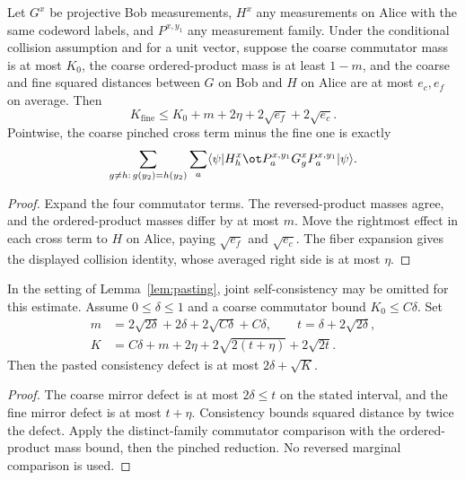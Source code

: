 \begin{lemma}
	\label{lem:pasting-distinct-fine-commutator}
	\leanok
	Let $G^x$ be projective Bob measurements, $H^x$ any measurements on Alice
	with the same codeword labels, and $P^{x,y_1}$ any measurement family.
	Under the conditional collision assumption and for a unit vector, suppose
	the coarse commutator mass is at most $K_0$, the coarse ordered-product
	mass is at least $1-m$, and the coarse and fine squared distances between
	$G$ on Bob and $H$ on Alice are at most $e_c,e_f$ on average. Then
	\[
	 K_{\mathrm{fine}}\leq K_0+m+2\eta+2\sqrt{e_f}+2\sqrt{e_c}.
	\]
	Pointwise, the coarse pinched cross term minus the fine one is exactly
	\[
	 \sum_{g\ne h:\,g(y_2)=h(y_2)}\sum_a
	 \langle\psi|H^x_h\ot P^{x,y_1}_aG^x_gP^{x,y_1}_a|\psi\rangle.
	\]
\end{lemma}
\begin{proof}
	\leanok
	Expand the four commutator terms. The reversed-product masses agree,
	and the ordered-product masses differ by at most $m$.
	Move the rightmost effect in each cross term to $H$ on Alice, paying
	$\sqrt{e_f}$ and $\sqrt{e_c}$. The fiber expansion gives the displayed
	collision identity, whose averaged right side is at most $\eta$.
\end{proof}

\begin{lemma}
	\label{lem:pasting-one-sided-explicit-error}
	\leanok
	In the setting of Lemma~\ref{lem:pasting}, joint self-consistency may be
	omitted for this estimate. Assume $0\leq\delta\leq1$ and a coarse
	commutator bound $K_0\leq C\delta$. Set
	\begin{align*}
	 m&=2\sqrt{2\delta}+2\delta+2\sqrt{C\delta}+C\delta,\qquad
	 t=\delta+2\sqrt{2\delta},\\
	 K&=C\delta+m+2\eta+2\sqrt{2(t+\eta)}+2\sqrt{2t}.
	\end{align*}
	Then the pasted consistency defect is at most $2\delta+\sqrt K$.
\end{lemma}
\begin{proof}
	\leanok
	The coarse mirror defect is at most $2\delta\leq t$ on the stated
	interval, and the fine mirror defect is at most $t+\eta$.
	Consistency bounds squared distance by twice the defect. Apply the
	distinct-family commutator comparison with the ordered-product mass bound,
	then the pinched reduction. No reversed marginal comparison is used.
\end{proof}


